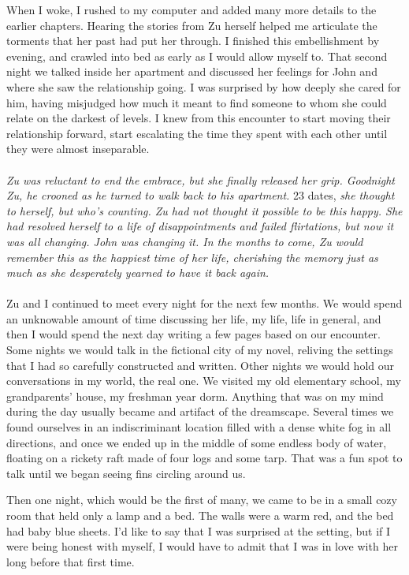 \documentclass[12pt,oneside,openany]{memoir}
\begin{document}
\indent When I woke, I rushed to my computer and added many more details to the earlier chapters. Hearing the stories from Zu herself helped me articulate the torments that her past had put her through. I finished this embellishment by evening, and crawled into bed as early as I would allow myself to. That second night we talked inside her apartment and discussed her feelings for John and where she saw the relationship going. I was surprised by how deeply she cared for him, having misjudged how much it meant to find someone to whom she could relate on the darkest of levels. I knew from this encounter to start moving their relationship forward, start escalating the time they spent with each other until they were almost inseparable.
\\\\	
\indent\textit{	Zu was reluctant to end the embrace, but she finally released her grip. Goodnight Zu, he crooned as he turned to walk back to his apartment.} 23 dates, \textit{she thought to herself, but who’s counting. Zu had not thought it possible to be this happy. She had resolved herself to a life of disappointments and failed flirtations, but now it was all changing. John was changing it. In the months to come, Zu would remember this as the happiest time of her life, cherishing the memory just as much as she desperately yearned to have it back again.}
\\\\	
\indent Zu and I continued to meet every night for the next few months. We would spend an unknowable amount of time discussing her life, my life, life in general, and then I would spend the next day writing a few pages based on our encounter. Some nights we would talk in the fictional city of my novel, reliving the settings that I had so carefully constructed and written. Other nights we would hold our conversations in my world, the real one. We visited my old elementary school, my grandparents’ house, my freshman year dorm. Anything that was on my mind during the day usually became and artifact of the dreamscape. Several times we found ourselves in an indiscriminant location filled with a dense white fog in all directions, and once we ended up in the middle of some endless body of water, floating on a rickety raft made of four logs and some tarp. That was a fun spot to talk until we began seeing fins circling around us.
	
	Then one night, which would be the first of many, we came to be in a small cozy room that held only a lamp and a bed. The walls were a warm red, and the bed had baby blue sheets. I’d like to say that I was surprised at the setting, but if I were being honest with myself, I would have to admit that I was in love with her long before that first time.
	
\end{document}
